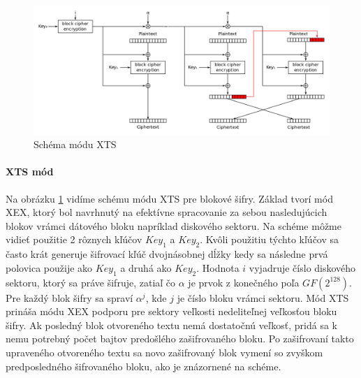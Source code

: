\begin{figure}[h]
    \centering
    \includegraphics[width=1\textwidth]{XTS_mode_encryption}
    \caption{Schéma módu XTS}
    \label{fig:XTS}
\end{figure}

\paragraph{XTS mód}
Na obrázku \ref{fig:XTS} vidíme schému módu XTS pre blokové šifry. Základ tvorí mód XEX, ktorý bol navrhnutý na efektívne spracovanie za sebou nasledujúcich blokov vrámci dátového bloku napríklad diskového sektoru. Na schéme môžme vidieť použitie 2 rôznych kľúčov \(Key_1\) a \(Key_2\). Kvôli použitiu týchto kľúčov sa často krát generuje šifrovací kľúč dvojnásobnej dĺžky kedy sa následne prvá polovica použije ako \(Key_1\) a druhá ako \(Key_2\). Hodnota \(i\) vyjadruje číslo diskového sektoru, ktorý sa práve šifruje, zatiaľ čo \(\alpha\) je prvok z konečného poľa \(GF(2^128)\). Pre každý blok šifry sa spraví \(\alpha^j\), kde \(j\) je číslo bloku vrámci sektoru. Mód XTS prináša módu XEX podporu pre sektory veľkosti nedeliteľnej veľkosťou bloku šifry. Ak posledný blok otvoreného textu nemá dostatočnú veľkosť, pridá sa k nemu potrebný počet bajtov predošlého zašifrovaného bloku. Po zašifrovaní takto upraveného otvoreného textu sa novo zašifrovaný blok vymení so zvyškom predposledného šifrovaného bloku, ako je znázornené na schéme.

